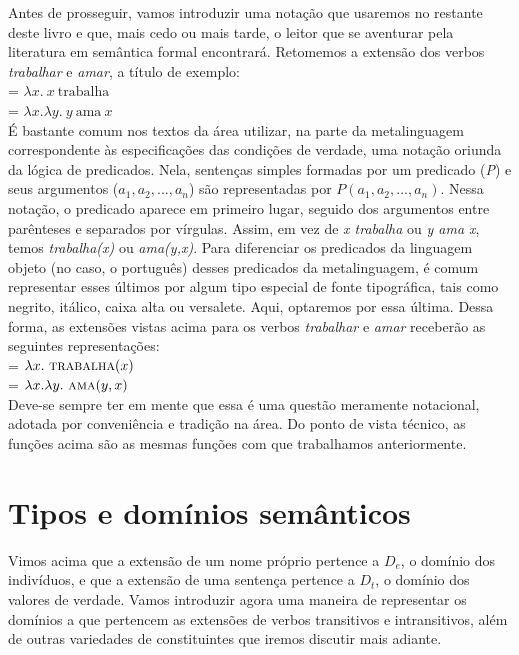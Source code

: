 Antes de prosseguir, vamos introduzir uma notação que usaremos no restante deste livro e que, mais cedo ou mais tarde, o leitor que se aventurar pela literatura em semântica formal encontrará. Retomemos a extensão dos verbos \textit{trabalhar} e \textit{amar}, a título de exemplo:\\

\n {} = $\lambda x.\ x\ \text{trabalha}$ \\

\n {} = $\lambda x.\lambda y.\ y\ \text{ama}\ x$ \\

\n É bastante comum nos textos da área utilizar, na parte da metalinguagem correspondente às especificações das condições de verdade, uma notação oriunda da lógica de predicados. Nela, sentenças simples formadas por um predicado (\textit{P}) e seus argumentos ($a_{1}, a_{2}, ..., a_{n}$) são representadas por $P(a_{1}, a_{2}, ..., a_{n})$. Nessa notação, o predicado aparece em primeiro lugar, seguido dos argumentos entre parênteses e separados por vírgulas. Assim, em vez de \textit{x trabalha} ou \textit{y ama x}, temos \textit{trabalha(x)} ou \textit{ama(y,x)}. Para diferenciar os predicados da linguagem objeto (no caso, o português)  desses predicados da metalinguagem, é comum representar esses últimos por algum tipo especial de fonte tipográfica, tais como negrito, itálico, caixa alta ou versalete. Aqui, optaremos por essa última. Dessa forma, as extensões vistas acima para os verbos \textit{trabalhar} e \textit{amar} receberão as seguintes representações:\\

\n {} = $\lambda x.\ \text{\textsc{trabalha}}(x)$ \\

\n {} = $\lambda x.\lambda y.\ \text{\textsc{ama}}(y,x)$ \\

Deve-se sempre ter em mente que essa é uma questão meramente notacional, adotada por conveniência e tradição na área. Do ponto de vista técnico, as funções acima são as mesmas funções com que trabalhamos anteriormente.

\section{Tipos e domínios semânticos}

Vimos acima que a extensão de um nome próprio pertence a $D_{e}$, o
domínio dos indivíduos, e que a extensão de uma sentença pertence
a $D_{t}$, o domínio dos valores de verdade. Vamos introduzir agora
uma maneira de representar os domínios a que pertencem as
extensões de verbos transitivos e intransitivos, além de outras
variedades de constituintes que iremos discutir mais adiante.

